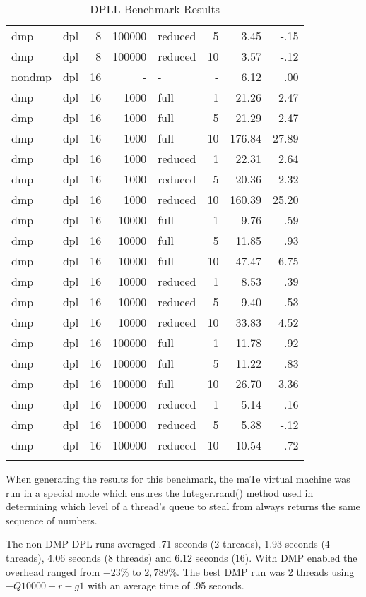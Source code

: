 \begin{center}
\begin{small}
\begin{longtable}{llrrlrrr}
dmp & dpl & 8 & 100000 & reduced & 5 & 3.45 & -.15\\
dmp & dpl & 8 & 100000 & reduced & 10 & 3.57 & -.12\\
nondmp & dpl & 16 & - & - & - & 6.12 & .00\\
dmp & dpl & 16 & 1000 & full & 1 & 21.26 & 2.47\\
dmp & dpl & 16 & 1000 & full & 5 & 21.29 & 2.47\\
dmp & dpl & 16 & 1000 & full & 10 & 176.84 & 27.89\\
dmp & dpl & 16 & 1000 & reduced & 1 & 22.31 & 2.64\\
dmp & dpl & 16 & 1000 & reduced & 5 & 20.36 & 2.32\\
dmp & dpl & 16 & 1000 & reduced & 10 & 160.39 & 25.20\\
dmp & dpl & 16 & 10000 & full & 1 & 9.76 & .59\\
dmp & dpl & 16 & 10000 & full & 5 & 11.85 & .93\\
dmp & dpl & 16 & 10000 & full & 10 & 47.47 & 6.75\\
dmp & dpl & 16 & 10000 & reduced & 1 & 8.53 & .39\\
dmp & dpl & 16 & 10000 & reduced & 5 & 9.40 & .53\\
dmp & dpl & 16 & 10000 & reduced & 10 & 33.83 & 4.52\\
dmp & dpl & 16 & 100000 & full & 1 & 11.78 & .92\\
dmp & dpl & 16 & 100000 & full & 5 & 11.22 & .83\\
dmp & dpl & 16 & 100000 & full & 10 & 26.70 & 3.36\\
dmp & dpl & 16 & 100000 & reduced & 1 & 5.14 & -.16\\
dmp & dpl & 16 & 100000 & reduced & 5 & 5.38 & -.12\\
dmp & dpl & 16 & 100000 & reduced & 10 & 10.54 & .72\\
\hline
\caption{DPLL Benchmark Results}
\label{tab:dpll_results}
\end{longtable}
\end{small}
\end{center}

When generating the results for this benchmark, the maTe virtual
machine was run in a special mode which ensures the Integer.rand()
method used in determining which level of a thread's queue to steal
from always returns the same sequence of numbers.

The non-DMP DPL runs averaged .71 seconds (2 threads), 1.93 seconds (4
threads), 4.06 seconds (8 threads) and 6.12 seconds (16).  With DMP
enabled the overhead ranged from $-23\%$ to $2,789\%$.  The best DMP
run was 2 threads using $-Q10000 -r -g1$ with an average time of .95
seconds.

